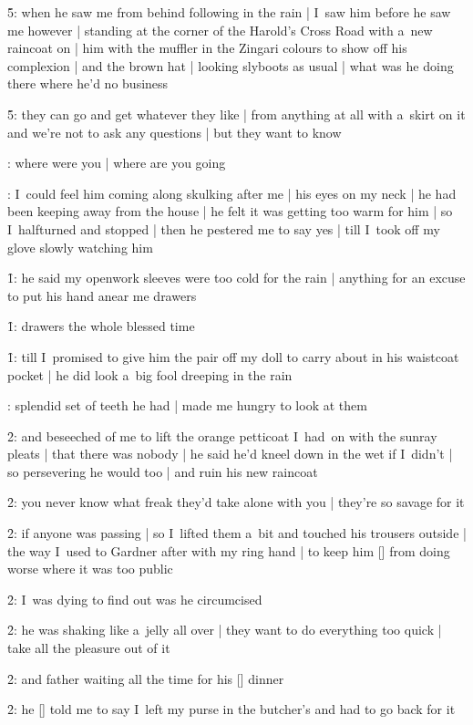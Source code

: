 \f5:
when he saw me from behind following in the rain |
I~saw him before he saw me however |
standing at the corner of the Harold's Cross Road with a~new raincoat on |
him with the muffler in the Zingari colours to show off his complexion |
and the brown hat |
looking slyboots as usual |
what was he doing there where he'd no business

\f5:
they can go and get whatever they like |
from anything at all with a~skirt on it and we're not to ask any questions |
but they want to know

:
where were you |
where are you going

:
I~could feel him coming along
skulking after me |
his eyes on my neck |
he had been keeping away from the house |
he felt it was getting too warm for him |
so I~halfturned and stopped |
then he pestered me to say yes |
till I~took off my glove slowly watching him

\f1:
he said my openwork sleeves were too cold for the rain |
anything for an excuse to put his hand anear me drawers

\f1:
drawers the whole blessed time

\f1:
till I~promised to give him the pair off my doll
to carry about in his waistcoat pocket |
 he did look a~big fool dreeping in the rain

:
splendid set of teeth he had |
made me hungry to look at them

\f2:
and beseeched of me to lift the orange petticoat I~had~on with the sunray pleats |
that there was nobody |
he said he'd kneel down in the wet if I~didn't |
so persevering he would too |
and ruin his new raincoat

\f2:
you never know what freak they'd take alone with you |
they're so savage for it

\f2:
if anyone was passing |
so I~lifted them a~bit and touched his trousers outside |
the way I~used to Gardner after with my ring hand |
to keep him [\bloom] from doing worse where it was too public

\f2:
I~was dying to find out was he circumcised

\f2:
he was shaking like a~jelly all over |
they want to do everything too quick |
take all the pleasure out of it

\f2:
and father waiting all the time for his [\father] dinner

\f2:
he [\bloom] told me to say I~left my purse in the butcher's
and had to go back for it

